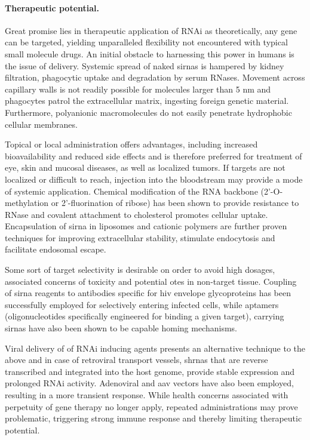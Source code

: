 \paragraph{Therapeutic potential.}
Great promise lies in therapeutic application of RNAi as theoretically, any gene can be targeted, yielding unparalleled flexibility not encountered with typical small molecule drugs. An initial obstacle to harnessing this power in humans is the issue of delivery. Systemic spread of naked \glspl{sirna} is hampered by kidney filtration, phagocytic uptake and degradation by serum RNases. Movement across capillary walls is not readily possible for molecules larger than 5 nm and phagocytes patrol the extracellular matrix, ingesting foreign genetic material. Furthermore, polyanionic macromolecules do not easily penetrate hydrophobic cellular membranes.

Topical or local administration offers advantages, including increased bioavailability and reduced side effects and is therefore preferred for treatment of eye, skin and mucosal diseases, as well as localized tumors. If targets are not localized or difficult to reach, injection into the bloodstream may provide a mode of systemic application. Chemical modification of the RNA backbone (2'-O-methylation or 2'-fluorination of ribose) has been shown to provide resistance to RNase and covalent attachment to cholesterol promotes cellular uptake. Encapsulation of \gls{sirna} in liposomes and cationic polymers are further proven techniques for improving extracellular stability, stimulate endocytosis and facilitate endosomal escape.

Some sort of target selectivity is desirable on order to avoid high dosages, associated concerns of toxicity and potential \glspl{ote} in non-target tissue. Coupling of \gls{sirna} reagents to antibodies specific for \gls{hiv} envelope glycoproteins has been successfully employed for selectively entering infected cells, while aptamers (oligonucleotides specifically engineered for binding a given target), carrying \glspl{sirna} have also been shown to be capable homing mechanisms.

Viral delivery of of RNAi inducing agents presents an alternative technique to the above and in case of retroviral transport vessels, \glspl{shrna} that are reverse transcribed and integrated into the host genome, provide stable expression and prolonged RNAi activity. Adenoviral and \gls{aav} vectors have also been employed, resulting in a more transient response. While health concerns associated with perpetuity of gene therapy no longer apply, repeated administrations may prove problematic, triggering strong immune response and thereby limiting therapeutic potential.

